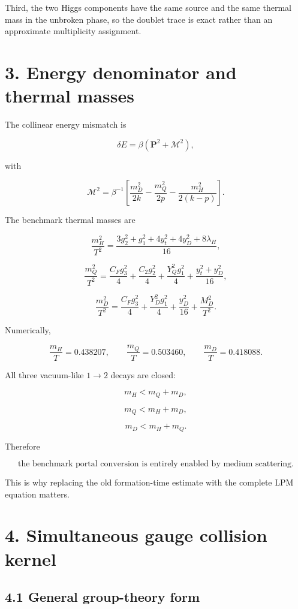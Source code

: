 \documentclass[
  10pt,
]{article}
\begin{document}
Third, the two Higgs components have the same source and the same
thermal mass in the unbroken phase, so the doublet trace is exact rather
than an approximate multiplicity assignment.

\section{3. Energy denominator and thermal
masses}\label{energy-denominator-and-thermal-masses}

The collinear energy mismatch is

\[
\delta E
=
\beta
\left(
\mathbf P^2+\mathcal M^2
\right),
\]

with

\[
\boxed{
\mathcal M^2
=
\beta^{-1}
\left[
\frac{m_D^2}{2k}
-
\frac{m_Q^2}{2p}
-
\frac{m_H^2}{2(k-p)}
\right].
}
\]

The benchmark thermal masses are

\[
\frac{m_H^2}{T^2}
=
\frac{
3g_2^2+g_1^2+4y_t^2+4y_D^2+8\lambda_H
}{16},
\]

\[
\frac{m_Q^2}{T^2}
=
\frac{C_Fg_3^2}{4}
+
\frac{C_2g_2^2}{4}
+
\frac{Y_Q^2g_1^2}{4}
+
\frac{y_t^2+y_D^2}{16},
\]

\[
\frac{m_D^2}{T^2}
=
\frac{C_Fg_3^2}{4}
+
\frac{Y_D^2g_1^2}{4}
+
\frac{y_D^2}{16}
+
\frac{M_D^2}{T^2}.
\]

Numerically,

\[
\boxed{
\frac{m_H}{T}=0.438207,
\qquad
\frac{m_Q}{T}=0.503460,
\qquad
\frac{m_D}{T}=0.418088.
}
\]

All three vacuum-like \(1\rightarrow2\) decays are closed:

\[
m_H<m_Q+m_D,
\]

\[
m_Q<m_H+m_D,
\]

\[
m_D<m_H+m_Q.
\]

Therefore

\[
\boxed{
\text{the benchmark portal conversion is entirely enabled by medium scattering.}
}
\]

This is why replacing the old formation-time estimate with the complete
LPM equation matters.

\section{4. Simultaneous gauge collision
kernel}\label{simultaneous-gauge-collision-kernel}

\subsection{4.1 General group-theory
form}\label{general-group-theory-form}
\end{document}
